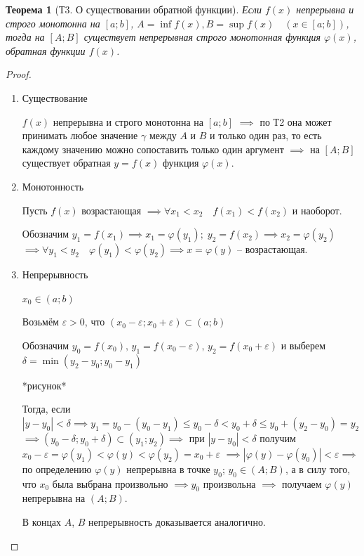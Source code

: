 \documentclass[a4paper,oneside]{article}
\newcommand{\eps}{\varepsilon}
\newtheorem{theorem}{Теорема}[subsection]
\theoremstyle{definition}
\theoremstyle{definition}
\theoremstyle{definition}
\begin{document}
\begin{theorem}[Т3. О существовании обратной функции]
    Если $f(x)$ непрерывна и строго монотонна на $[a; b]$, 
    $A = \inf f(x), B = \sup f(x) \quad (x \in [a; b])$,
    тогда на $[A; B]$ существует непрерывная строго монотонная функция
    $\varphi(x)$, обратная функции $f(x)$.
\end{theorem}
\begin{proof}
    \begin{enumerate}
        \item 
            Существование
        
            $f(x)$ непрерывна и строго монотонна на $[a; b]$ $\implies$ по Т2 она может
            принимать любое значение $\gamma$ между $A$ и $B$ и только один раз, то есть каждому
            значению можно сопоставить только один аргумент $\implies$ на $[A; B]$ существует
            обратная $y = f(x)$ функция $\varphi(x)$.

        \item
            Монотонность

            Пусть $f(x)$ возрастающая $\implies \forall x_1 < x_2 \quad f(x_1) < f(x_2)$ и наоборот.

            Обозначим $y_1 = f(x_1) \implies x_1 = \varphi(y_1); \; y_2 = f(x_2) \implies x_2 = \varphi(y_2)$
            $\implies \forall y_1 < y_2 \quad \varphi(y_1) < \varphi(y_2) \implies x = \varphi(y)$ -- возрастающая.
        
        \item
            Непрерывность

            $x_0 \in (a; b)$

            Возьмём $\eps > 0$, что $(x_0 - \eps; x_0 + \eps) \subset (a; b)$

            Обозначим $y_0 = f(x_0), \, y_1 = f(x_0 - \eps), \, y_2 = f(x_0 + \eps)$
            и выберем $\delta = \min (y_2 - y_0; y_0 - y_1)$

            *рисунок*

            Тогда, если $|y - y_0| < \delta \implies 
            y_1 = y_0 - (y_0 - y_1) \le y_0 - \delta < y_0 + \delta \le y_0 + (y_2 - y_0) = y_2$
            $\implies (y_0 - \delta; y_0 + \delta) \subset (y_1; y_2) \implies$ при
            $|y - y_0| < \delta$ получим $x_0 - \eps = \varphi(y_1) < \varphi(y) < \varphi(y_2) = x_0 + \eps$
            $\implies |\varphi(y) - \varphi(y_0)| < \eps \implies$ по определению $\varphi(y)$
            непрерывна в точке $y_0$; $y_0 \in (A; B)$, а в силу того, что $x_0$ была выбрана
            произвольно $\implies y_0$ произвольна $\implies$ получаем $\varphi(y)$ непрерывна на $(A; B)$.

            В концах $A$, $B$ непрерывность доказывается аналогично.
        \end{enumerate}
\end{proof}
\end{document}
